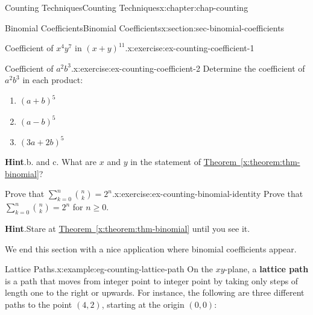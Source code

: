 \documentclass[oneside,10pt,]{book}
\newcommand{\blocktitlefont}{\relax}
\newcommand{\xreffont}{\relax}
\newcommand{\terminology}[1]{\textbf{#1}}
\numberwithin{equation}{section}
\begin{document}
\begin{chapterptx}{Counting Techniques}{}{Counting Techniques}{}{}{x:chapter:chap-counting}
\begin{sectionptx}{Binomial Coefficients}{}{Binomial Coefficients}{}{}{x:section:sec-binomial-coefficients}
\begin{inlineexercise}{Coefficient of \(x^4y^7\) in \((x+y)^{11}\).}{x:exercise:ex-counting-coefficient-1}
\end{inlineexercise}
\begin{inlineexercise}{Coefficient of \(a^2b^3\).}{x:exercise:ex-counting-coefficient-2}%
Determine the coefficient of \(a^2b^3\) in each product:%
\begin{enumerate}[label=(\alph*)]
\item{}\(\displaystyle (a+b)^5\)%
\item{}\(\displaystyle (a-b)^5\)%
\item{}\(\displaystyle (3a+2b)^5\)%
\end{enumerate}
%
\par\smallskip%
\noindent\textbf{\blocktitlefont Hint}.\hypertarget{g:hint:id468511}{}\quad{}b. and c. What are \(x\) and \(y\) in the statement of \hyperref[x:theorem:thm-binomial]{Theorem~{\xreffont\ref{x:theorem:thm-binomial}}}?%
\end{inlineexercise}
\begin{inlineexercise}{Prove that \(\displaystyle\sum_{k=0}^n \binom{n}{k} = 2^n\).}{x:exercise:ex-counting-binomial-identity}%
Prove that \(\displaystyle\sum_{k=0}^n \binom{n}{k} = 2^n\) for \(n \geq 0\).%
\par\smallskip%
\noindent\textbf{\blocktitlefont Hint}.\hypertarget{g:hint:id468797}{}\quad{}Stare at \hyperref[x:theorem:thm-binomial]{Theorem~{\xreffont\ref{x:theorem:thm-binomial}}} until you see it.%
\end{inlineexercise}
We end this section with a nice application where binomial coefficients appear.%
\begin{example}{Lattice Paths.}{x:example:eg-counting-lattice-path}%
On the \(xy\)-plane, a \terminology{lattice path} is a path that moves from integer point to integer point by taking only steps of length one to the right or upwards. For instance, the following are three different paths to the point \((4,2)\), starting at the origin \((0,0)\):%
\begin{sidebyside}{3}{0.0166666666666667}{0.0166666666666667}{0.0333333333333333}%
\begin{sbspanel}{0.3}%
\end{sbspanel}
\end{sidebyside}
\end{example}
\end{sectionptx}
\end{chapterptx}
\end{document}
